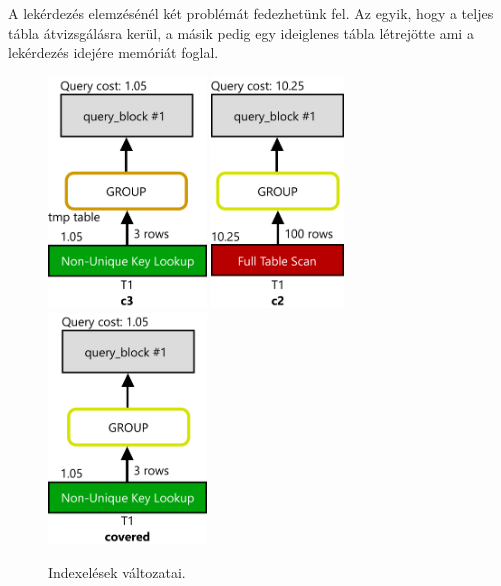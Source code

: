 A lekérdezés elemzésénél két problémát fedezhetünk fel. Az egyik, hogy a teljes tábla átvizsgálásra kerül, a másik pedig egy ideiglenes tábla létrejötte ami a lekérdezés idejére memóriát foglal.

\begin{figure}[h!]
\centering
\includegraphics[width=4.2cm]{images/explain/2-4.png}
\hspace{1cm} 
\includegraphics[width=3.51cm]{images/explain/2-2.png}
\hspace{1cm} 
\includegraphics[width=4.2cm]{images/explain/covered.png}
\caption{Indexelések változatai.}
\label{fig:schema}
\end{figure}

